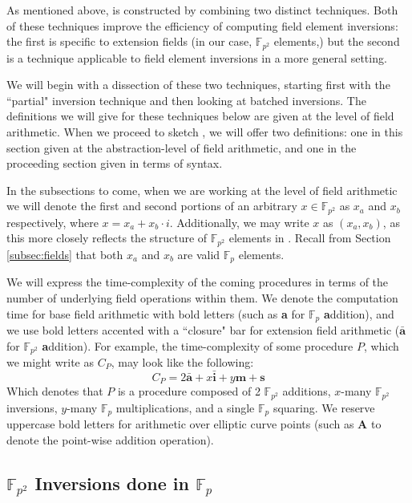 As mentioned above,  is constructed by combining two distinct techniques. Both of these techniques improve the efficiency of computing field element inversions: the first is specific to extension fields (in our case, $\mathbb{F}_{p^{2}}$ elements,) but the second is a technique applicable to field element inversions in a more general setting.

We will begin with a dissection of these two techniques, starting first with the ``partial" inversion technique and then looking at batched inversions. The definitions we will give for these techniques below are given at the level of field arithmetic. When we proceed to sketch , we will offer two definitions: one in this section given at the abstraction-level of field arithmetic, and one in the proceeding section given in terms of \sidh syntax.

In the subsections to come, when we are working at the level of field arithmetic we will denote the first and second portions of an arbitrary $x \in \mathbb{F}_{p^{2}}$ as $x_{a}$ and $x_{b}$ respectively, where $x = x_{a} + x_{b}\cdot i$. Additionally, we may write $x$ as $(x_{a}, x_{b})$, as this more closely reflects the structure of $\mathbb{F}_{p^{2}}$ elements in \sidh. Recall from Section \ref{subsec:fields} that both $x_{a}$ and $x_{b}$ are valid $\mathbb{F}_{p}$ elements. 

We will express the time-complexity of the coming procedures in terms of the number of underlying field operations within them. We denote the computation time for base field arithmetic with bold letters (such as \textbf{a} for $\mathbb{F}_p$ \textbf{a}ddition), and we use bold letters accented with a ``closure" bar for extension field arithmetic ($\bar{\textbf{a}}$ for $\mathbb{F}_{p^2}$ \textbf{a}ddition). For example, the time-complexity of some procedure $P$, which we might write as $C_{P}$, may look like the following:
$$
C_{P} = 2\bar{\textbf{a}} + x\bar{\textbf{i}} + y\textbf{m} + \textbf{s}
$$
Which denotes that $P$ is a procedure composed of 2 $\mathbb{F}_{p^{2}}$ additions, $x$-many $\mathbb{F}_{p^{2}}$ inversions, $y$-many $\mathbb{F}_{p}$ multiplications, and a single $\mathbb{F}_{p}$ squaring. We reserve uppercase bold letters for arithmetic over elliptic curve points (such as \textbf{A} to denote the point-wise addition operation).

\subsection{$\mathbb{F}_{p^{2}}$ Inversions done in $\mathbb{F}_{p}$}
\label{subsec:partialinv}

